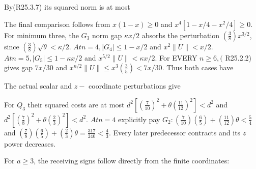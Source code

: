 
By(R25.3.7) its squared norm is at most


The final comparison follows from \(x(1-x)\ge 0\) and \(x^4[1-x/4-x^2/4]\ge 0\). For minimum three, the \(G_{3}\) norm gap \(\kappa x/2\) absorbs the perturbation \((\frac{3}{8})x^{3/2}\), since \((\frac{3}{8})\sqrt{\theta}<\kappa/2\). \(At n=4,\allowbreak \allowbreak  \lvert G_{4}\rvert \le 1-x/2\) and \(x^2\lVert U\rVert <x/2\). \(At n=5,\allowbreak \allowbreak  \lvert G_{5}\rvert \le 1-\kappa x/2\) and \(x^{5/2}\lVert U\rVert <\kappa x/2\). For EVERY \(n\ge 6,\allowbreak \allowbreak  (\) R25.2.2) gives gap \(7x/30\) and \(x^{n/2}\lVert U\rVert \le x^3(\frac{3}{5})<7x/30\). Thus both cases have


The actual scalar and \(z-\) coordinate perturbations give


For \(Q_{3}\) their squared costs are at most \(d^2[(\frac{7}{10})^2+\theta(\frac{11}{12})^2]<d^2\) and \(d^2[(\frac{7}{8})^2+\theta(\frac{2}{3})^2]<d^2\). \(At n=4\) explicitly pay \(G_{2}: (\frac{7}{10})(\frac{6}{5})+(\frac{11}{12})\theta<\frac{5}{4}\) and \((\frac{7}{8})(\frac{6}{5})+(\frac{2}{3})\theta=\frac{317}{240}<\frac{4}{3}\). Every later predecessor contracts and its \(z\) power decreases.

For \(a\ge3\), the receiving signs follow directly from the finite coordinates:


